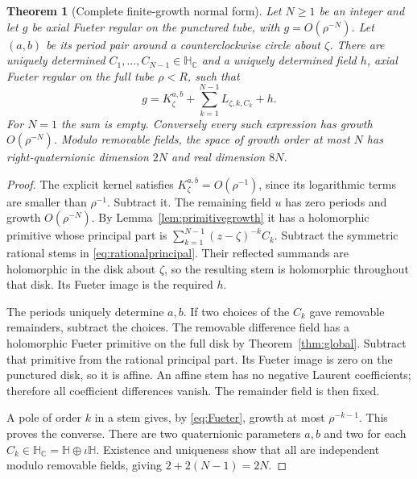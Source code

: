 \documentclass[11pt,a4paper]{article}
\numberwithin{equation}{section}
\newtheorem{theorem}{Theorem}[section]
\theoremstyle{definition}
\theoremstyle{remark}
\newcommand{\C}{\mathbb C}
\newcommand{\HH}{\mathbb H}
\newcommand{\HC}{\mathbb H_{\C}}
\begin{document}
\begin{theorem}[Complete finite-growth normal form]
\label{thm:normalform}
Let $N\geq1$ be an integer and let $g$ be axial Fueter regular on the
punctured tube, with $g=O(\rho^{-N})$. Let $(a,b)$ be its period pair
around a counterclockwise circle about $\zeta$. There are uniquely
determined $C_1,\ldots,C_{N-1}\in\HC$ and a uniquely determined field
$h$, axial Fueter regular on the full tube $\rho<R$, such that
\begin{equation}
 g=K_\zeta^{a,b}+\sum_{k=1}^{N-1}L_{\zeta,k,C_k}+h.
 \label{eq:normalform}
\end{equation}
For $N=1$ the sum is empty. Conversely every such expression has growth
$O(\rho^{-N})$. Modulo removable fields, the space of growth order at
most $N$ has right-quaternionic dimension $2N$ and real dimension $8N$.
\end{theorem}
\begin{proof}
The explicit kernel satisfies $K_\zeta^{a,b}=O(\rho^{-1})$, since its
logarithmic terms are smaller than $\rho^{-1}$. Subtract it. The remaining
field $u$ has zero periods and growth $O(\rho^{-N})$. By
Lemma~\ref{lem:primitivegrowth} it has a holomorphic primitive whose
principal part is
$\sum_{k=1}^{N-1}(z-\zeta)^{-k}C_k$. Subtract the symmetric rational
stems in \eqref{eq:rationalprincipal}. Their reflected summands are
holomorphic in the disk about $\zeta$, so the resulting stem is
holomorphic throughout that disk. Its Fueter image is the required $h$.

The periods uniquely determine $a,b$. If two choices of the $C_k$ gave
removable remainders, subtract the choices. The removable difference
field has a holomorphic Fueter primitive on the full disk by
Theorem~\ref{thm:global}. Subtract that primitive from the rational
principal part. Its Fueter image is zero on the punctured disk, so it is
affine. An affine stem has no negative Laurent coefficients; therefore
all coefficient differences vanish. The remainder field is then fixed.

A pole of order $k$ in a stem gives, by \eqref{eq:Fueter}, growth at most
$\rho^{-k-1}$. This proves the converse. There are two quaternionic
parameters $a,b$ and two for each $C_k\in\HC=\HH\oplus\iota\HH$.
Existence and uniqueness show that all are independent modulo removable
fields, giving $2+2(N-1)=2N$.
\end{proof}
\end{document}
